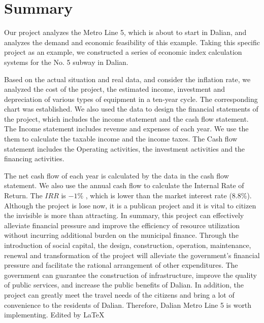 \documentclass[12pt]{article}
\begin{document}
\section{Summary}
Our project analyzes the Metro Line 5, which is about to start in Dalian, and analyzes the demand and economic feasibility of this example. Taking this specific project as an example, we constructed a series of economic index calculation systems for the No. 5 subway in Dalian.
\par Based on the actual situation and real data, and consider the inflation rate, we analyzed the cost of the project, the estimated income, investment and depreciation of various types of equipment in a ten-year cycle. The corresponding chart was established. We also used the data to design the financial statements of the project, which includes the income statement and the cash flow statement. The Income statement includes revenue and expenses of each year. We use the them to calculate the taxable income and the income taxes. The Cash flow statement includes the Operating activities, the investment activities and the financing activities.
\par The net cash flow of each year is calculated by the data in the cash flow statement. We also use the annual cash flow to calculate the Internal Rate of Return. The $IRR$ is $-1\%$ , which is lower than the market interest rate (8.8\%). Although the project is lose now, it is a publican project and it is vital to citizen the invisible is more than attracting. In summary, this project can effectively alleviate financial pressure and improve the efficiency of resource utilization without incurring additional burden on the municipal finance. Through the introduction of social capital, the design, construction, operation, maintenance, renewal and transformation of the project will alleviate the government's financial pressure and facilitate the rational arrangement of other expenditures. The government can guarantee the construction of infrastructure, improve the quality of public services, and increase the public benefits of Dalian. In addition, the project can greatly meet the travel needs of the citizens and bring a lot of convenience to the residents of Dalian. Therefore, Dalian Metro Line 5 is worth implementing.
\newline\newline Edited by \LaTeX
\end{document}
